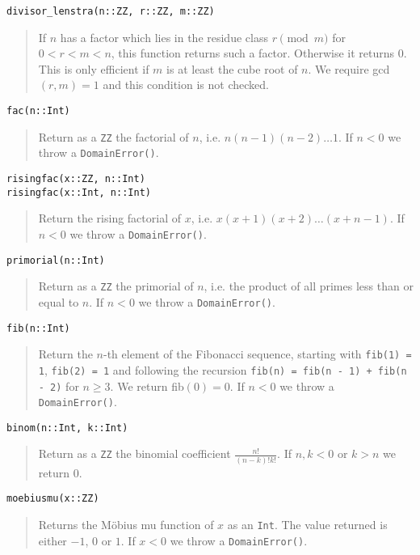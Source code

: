 \documentclass[a4paper,10pt]{article}
\newcommand{\code}{\lstinline}
\newcommand{\desc}[1]{\vspace{-3mm}\begin{quote}#1\end{quote}}
\begin{document}
{{{{{{\begin{lstlisting}
divisor_lenstra(n::ZZ, r::ZZ, m::ZZ)
\end{lstlisting}

\desc{If $n$ has a factor which lies in the residue class $r \pmod{m}$ for $0 < r < m < n$,
this function returns such a factor. Otherwise it returns $0$. This is only efficient if 
$m$ is at least the cube root of $n$. We require gcd$(r, m) = 1$ and this condition is not
checked.}

\begin{lstlisting}
fac(n::Int)
\end{lstlisting}

\desc{Return as a \code{ZZ} the factorial of $n$, i.e. $n(n - 1)(n - 2)\ldots 1$.
If $n < 0$ we throw a \code{DomainError()}.}

\begin{lstlisting}
risingfac(x::ZZ, n::Int)
risingfac(x::Int, n::Int)
\end{lstlisting}

\desc{Return the rising factorial of $x$, i.e. $x(x + 1)(x + 2)\ldots (x + n - 1)$.
If $n < 0$ we throw a \code{DomainError()}.}

\begin{lstlisting}
primorial(n::Int)
\end{lstlisting}

\desc{Return as a \code{ZZ} the primorial of $n$, i.e. the product of all primes
less than or equal to $n$. If $n < 0$ we throw a \code{DomainError()}.}

\begin{lstlisting}
fib(n::Int)
\end{lstlisting}

\desc{Return the $n$-th element of the Fibonacci sequence, starting with 
\code{fib(1) = 1}, \code{fib(2) = 1} and following the recursion 
\code{fib(n) = fib(n - 1) + fib(n - 2)} for $n \geq 3$.
We return fib$(0) = 0$. If $n < 0$ we throw a \code{DomainError()}.}

\begin{lstlisting}
binom(n::Int, k::Int)
\end{lstlisting}

\desc{Return as a \code{ZZ} the binomial coefficient $\frac{n!}{(n - k)!k!}$. If
$n, k < 0$ or $k > n$ we return $0$.}

\begin{lstlisting}
moebiusmu(x::ZZ)
\end{lstlisting}

\desc{Returns the M\"{o}bius mu function of $x$ as an \code{Int}. The value returned is
either $-1$, $0$ or $1$. If $x < 0$ we throw a \code{DomainError()}.}

}}}}}}
\end{document}
